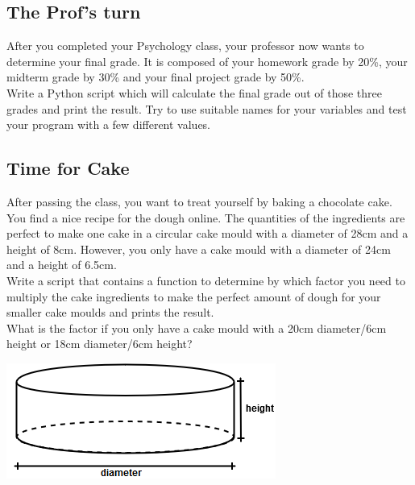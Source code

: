 \subsection{The Prof's turn}
After you completed your Psychology class, your professor now wants to determine your final grade.
It is composed of your homework grade by 20\%, your midterm grade by 30\% and your final
project grade by 50\%.\\
Write a Python script which will calculate the final grade out of those three grades
and print the result. Try to use suitable names for your variables and test your program with
a few different values.

\cprotect{}

\subsection{Time for Cake}
After passing the class, you want to treat yourself by baking a chocolate cake.
You find a nice recipe for the dough online.
The quantities of the ingredients are perfect to make one cake in a circular cake mould with a diameter
of 28cm and a height of 8cm. However, you only have a cake mould with a diameter of 24cm and a height of 6.5cm.\\
Write a script that contains a function to determine by which factor you need to multiply the cake ingredients
to make the perfect amount of dough for your smaller cake moulds and prints the result.\\
What is the factor if you only have a cake mould with a 20cm diameter/6cm height or 18cm diameter/6cm height?

\cprotect{}

\begin{center}
\includegraphics[scale=0.6]{Ex_2_Cake}
\end{center}


